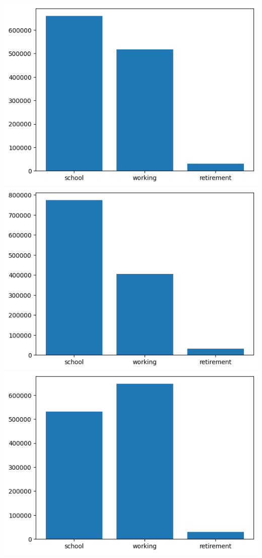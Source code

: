 \documentclass[10pt]{article}
\begin{document}
\includegraphics{fig_demo.png}
\includegraphics{fig_demo_up.png}
\includegraphics{fig_demo_down.png}
\end{document}
